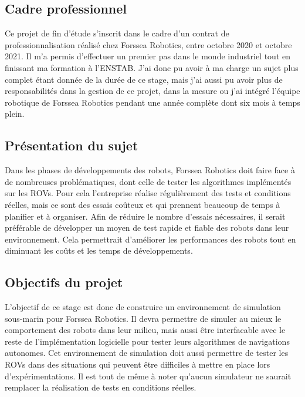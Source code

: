 \subsection{Cadre professionnel}
    Ce projet de fin d'étude s'inscrit dans le cadre d'un contrat de professionnalisation réalisé chez Forssea Robotics, entre octobre 2020 et octobre 2021. Il m'a permis d'effectuer un premier pas dans le monde industriel tout en finissant ma formation à l'\gls{ENSTAB}. J'ai donc pu avoir à ma charge un sujet plus complet étant donnée de la durée de ce stage, mais j'ai aussi pu avoir plus de responsabilités dans la gestion de ce projet, dans la mesure ou j'ai intégré l'équipe robotique de Forssea Robotics pendant une année complète dont six mois à temps plein.

\subsection{Présentation du sujet}
    Dans les phases de développements des robots, Forssea Robotics doit faire face à de nombreuses problématiques, dont celle de tester les algorithmes implémentés sur les \gls{ROV}s. Pour cela l'entreprise réalise régulièrement des tests et conditions réelles, mais ce sont des essais coûteux et qui prennent beaucoup de temps à planifier et à organiser. Afin de réduire le nombre d'essais nécessaires, il serait préférable de développer un moyen de test rapide et fiable des robots dans leur environnement. Cela permettrait d'améliorer les performances des robots tout en diminuant les coûts et les temps de développements.

\subsection{Objectifs du projet}
    L'objectif de ce stage est donc de construire un environnement de simulation sous-marin pour Forssea Robotics. Il devra permettre de simuler au mieux le comportement des robots dans leur milieu, mais aussi être interfacable avec le reste de l'implémentation logicielle pour tester leurs algorithmes de navigations autonomes. Cet environnement de simulation doit aussi permettre de tester les \gls{ROV}s dans des situations qui peuvent être difficiles à mettre en place lors d'expérimentations. Il est tout de même à noter qu'aucun simulateur ne saurait remplacer la réalisation de tests en conditions réelles.
